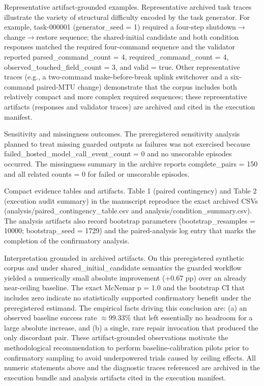 \documentclass[conference]{IEEEtran}
\begin{document}
Representative artifact-grounded examples. Representative archived task traces illustrate the variety of structural difficulty encoded by the task generator. For example, task-000001 (generator\_seed = 1) required a four-step shutdown\ensuremath{\rightarrow}change\ensuremath{\rightarrow}restore sequence; the shared-initial candidate and both condition responses matched the required four-command sequence and the validator reported parsed\_command\_count = 4, required\_command\_count = 4, observed\_touched\_field\_count = 3, and valid = true. Other representative traces (e.g., a two-command make-before-break uplink switchover and a six-command paired-MTU change) demonstrate that the corpus includes both relatively compact and more complex required sequences; these representative artifacts (responses and validator traces) are archived and cited in the execution manifest.

Sensitivity and missingness outcomes. The preregistered sensitivity analysis planned to treat missing guarded outputs as failures was not exercised because failed\_hosted\_model\_call\_event\_count = 0 and no unscorable episodes occurred. The missingness summary in the archive reports complete\_pairs = 150 and all related counts = 0 for failed or unscorable episodes.

Compact evidence tables and artifacts. Table 1 (paired contingency) and Table 2 (execution audit summary) in the manuscript reproduce the exact archived CSVs (analysis/paired\_contingency\_table.csv and analysis/condition\_summary.csv). The analysis artifacts also record bootstrap parameters (bootstrap\_resamples = 10000; bootstrap\_seed = 1729) and the paired-analysis log entry that marks the completion of the confirmatory analysis.

Interpretation grounded in archived artifacts. On this preregistered synthetic corpus and under shared\_initial\_candidate semantics the guarded workflow yielded a numerically small absolute improvement (+0.67 pp) over an already near-ceiling baseline. The exact McNemar p = 1.0 and the bootstrap CI that includes zero indicate no statistically supported confirmatory benefit under the preregistered estimand. The empirical facts driving this conclusion are: (a) an observed baseline success rate \ensuremath{\approx}99.33\% that left essentially no headroom for a large absolute increase, and (b) a single, rare repair invocation that produced the only discordant pair. These artifact-grounded observations motivate the methodological recommendation to perform baseline-calibration pilots prior to confirmatory sampling to avoid underpowered trials caused by ceiling effects. All numeric statements above and the diagnostic traces referenced are archived in the execution bundle and analysis artifacts cited in the execution manifest.
\end{document}

